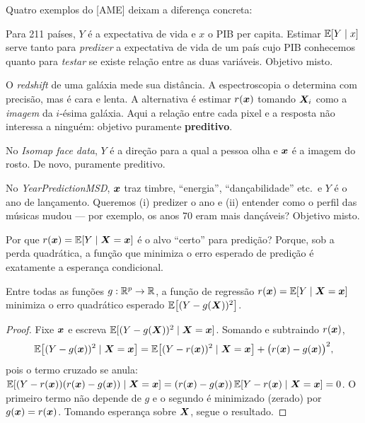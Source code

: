 \documentclass[11pt,a4paper]{article}
\begin{document}
\noindent
Quatro exemplos do [AME] deixam a diferença concreta:

\begin{exemplo}
Para 211 países, $Y$ é a expectativa de vida e $x$ o PIB per capita. Estimar
$\mathbb{E}[Y\mid x]$ serve tanto para \emph{predizer} a expectativa de vida de um país cujo
PIB conhecemos quanto para \emph{testar} se existe relação entre as duas variáveis.
Objetivo misto.
\end{exemplo}

\begin{exemplo}
O \emph{redshift} de uma galáxia mede sua distância. A espectroscopia o determina
com precisão, mas é cara e lenta. A alternativa é estimar $r(\bm{x})$ tomando $\bm{X}_i$ como
a \emph{imagem} da $i$-ésima galáxia. Aqui a relação entre cada pixel e a resposta não
interessa a ninguém: objetivo puramente \textbf{preditivo}.
\end{exemplo}

\begin{exemplo}
No \emph{Isomap face data}, $Y$ é a direção para a qual a pessoa olha e $\bm{x}$ é a
imagem do rosto. De novo, puramente preditivo.
\end{exemplo}

\begin{exemplo}
No \emph{YearPredictionMSD}, $\bm{x}$ traz timbre, ``energia'', ``dançabilidade'' etc.\ e
$Y$ é o ano de lançamento. Queremos (i) predizer o ano e (ii) entender como o perfil
das músicas mudou --- por exemplo, os anos 70 eram mais dançáveis? Objetivo misto.
\end{exemplo}

\begin{ideia}
Por que $r(\bm{x})=\mathbb{E}[Y\mid\bm{X}=\bm{x}]$ é o alvo ``certo'' para predição? Porque, sob a
perda quadrática, a função que minimiza o erro esperado de predição é exatamente a
esperança condicional.
\end{ideia}

\begin{proposicao}\label{prop:r}
Entre todas as funções $g:\mathbb{R}^p\to\mathbb{R}$, a função de regressão
$r(\bm{x})=\mathbb{E}[Y\mid\bm{X}=\bm{x}]$ minimiza o erro quadrático esperado
$\mathbb{E}\big[(Y-g(\bm{X}))^2\big]$.
\end{proposicao}
\begin{proof}
Fixe $\bm{x}$ e escreva $\mathbb{E}[(Y-g(\bm{X}))^2\mid\bm{X}=\bm{x}]$. Somando e subtraindo $r(\bm{x})$,
\[
  \mathbb{E}\big[(Y-g(\bm{x}))^2\mid\bm{X}=\bm{x}\big]
  = \mathbb{E}\big[(Y-r(\bm{x}))^2\mid\bm{X}=\bm{x}\big] + \big(r(\bm{x})-g(\bm{x})\big)^2,
\]
pois o termo cruzado se anula:
$\mathbb{E}[(Y-r(\bm{x}))(r(\bm{x})-g(\bm{x}))\mid\bm{X}=\bm{x}]=(r(\bm{x})-g(\bm{x}))\,\mathbb{E}[Y-r(\bm{x})\mid\bm{X}=\bm{x}]=0$.
O primeiro termo não depende de $g$ e o segundo é minimizado (zerado) por
$g(\bm{x})=r(\bm{x})$. Tomando esperança sobre $\bm{X}$, segue o resultado.
\end{proof}
\end{document}
